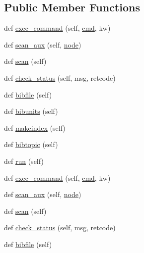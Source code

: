 \subsection*{Public Member Functions}
\begin{DoxyCompactItemize}
\item 
def \hyperlink{classwaflib_1_1_tools_1_1tex_1_1tex_af3bd4c7abea22374fe7cb435022880cd}{exec\+\_\+command} (self, \hyperlink{sndfile__play_8m_adfc5ba7e22f5e4a6221c12a70503bef3}{cmd}, kw)
\item 
def \hyperlink{classwaflib_1_1_tools_1_1tex_1_1tex_abd3866cf63c379f3bdd3e1568f32182a}{scan\+\_\+aux} (self, \hyperlink{structnode}{node})
\item 
def \hyperlink{classwaflib_1_1_tools_1_1tex_1_1tex_a9a1611c5caf6c5ef3bf0efbcd7cdb0b4}{scan} (self)
\item 
def \hyperlink{classwaflib_1_1_tools_1_1tex_1_1tex_ac5e3e5ed9bae28652ceec355e87c041b}{check\+\_\+status} (self, msg, retcode)
\item 
def \hyperlink{classwaflib_1_1_tools_1_1tex_1_1tex_a84f06095e6adb078c76849aaad9caaa7}{bibfile} (self)
\item 
def \hyperlink{classwaflib_1_1_tools_1_1tex_1_1tex_adc9975ca42cc99bdfed2453d0501deb7}{bibunits} (self)
\item 
def \hyperlink{classwaflib_1_1_tools_1_1tex_1_1tex_a037e014ad6faffb9d86bce5a13038776}{makeindex} (self)
\item 
def \hyperlink{classwaflib_1_1_tools_1_1tex_1_1tex_a91f60e48f7933bde8c62a1108c408f84}{bibtopic} (self)
\item 
def \hyperlink{classwaflib_1_1_tools_1_1tex_1_1tex_a9ca231d8975e3c1d5d3c9e455f31f892}{run} (self)
\item 
def \hyperlink{classwaflib_1_1_tools_1_1tex_1_1tex_af3bd4c7abea22374fe7cb435022880cd}{exec\+\_\+command} (self, \hyperlink{sndfile__play_8m_adfc5ba7e22f5e4a6221c12a70503bef3}{cmd}, kw)
\item 
def \hyperlink{classwaflib_1_1_tools_1_1tex_1_1tex_abd3866cf63c379f3bdd3e1568f32182a}{scan\+\_\+aux} (self, \hyperlink{structnode}{node})
\item 
def \hyperlink{classwaflib_1_1_tools_1_1tex_1_1tex_a9a1611c5caf6c5ef3bf0efbcd7cdb0b4}{scan} (self)
\item 
def \hyperlink{classwaflib_1_1_tools_1_1tex_1_1tex_ac5e3e5ed9bae28652ceec355e87c041b}{check\+\_\+status} (self, msg, retcode)
\item 
def \hyperlink{classwaflib_1_1_tools_1_1tex_1_1tex_a84f06095e6adb078c76849aaad9caaa7}{bibfile} (self)

\end{DoxyCompactItemize}
